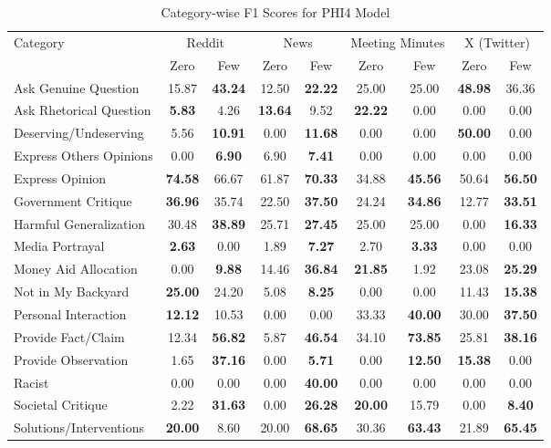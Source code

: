 \begin{table*}[htbp]
\centering
\begin{tabular}{l *{8}{c}}
\toprule
Category & \multicolumn{2}{c}{Reddit} & \multicolumn{2}{c}{News} & \multicolumn{2}{c}{Meeting Minutes} & \multicolumn{2}{c}{X (Twitter)} \\
& Zero & Few & Zero & Few & Zero & Few & Zero & Few \\
\midrule
Ask Genuine Question & 15.87 & \textbf{43.24} & 12.50 & \textbf{22.22} & 25.00 & 25.00 & \textbf{48.98} & 36.36 \\
Ask Rhetorical Question & \textbf{5.83} & 4.26 & \textbf{13.64} & 9.52 & \textbf{22.22} & 0.00 & 0.00 & 0.00 \\
Deserving/Undeserving & 5.56 & \textbf{10.91} & 0.00 & \textbf{11.68} & 0.00 & 0.00 & \textbf{50.00} & 0.00 \\
Express Others Opinions & 0.00 & \textbf{6.90} & 6.90 & \textbf{7.41} & 0.00 & 0.00 & 0.00 & 0.00 \\
Express Opinion & \textbf{74.58} & 66.67 & 61.87 & \textbf{70.33} & 34.88 & \textbf{45.56} & 50.64 & \textbf{56.50} \\
Government Critique & \textbf{36.96} & 35.74 & 22.50 & \textbf{37.50} & 24.24 & \textbf{34.86} & 12.77 & \textbf{33.51} \\
Harmful Generalization & 30.48 & \textbf{38.89} & 25.71 & \textbf{27.45} & 25.00 & 25.00 & 0.00 & \textbf{16.33} \\
Media Portrayal & \textbf{2.63} & 0.00 & 1.89 & \textbf{7.27} & 2.70 & \textbf{3.33} & 0.00 & 0.00 \\
Money Aid Allocation & 0.00 & \textbf{9.88} & 14.46 & \textbf{36.84} & \textbf{21.85} & 1.92 & 23.08 & \textbf{25.29} \\
Not in My Backyard & \textbf{25.00} & 24.20 & 5.08 & \textbf{8.25} & 0.00 & 0.00 & 11.43 & \textbf{15.38} \\
Personal Interaction & \textbf{12.12} & 10.53 & 0.00 & 0.00 & 33.33 & \textbf{40.00} & 30.00 & \textbf{37.50} \\
Provide Fact/Claim & 12.34 & \textbf{56.82} & 5.87 & \textbf{46.54} & 34.10 & \textbf{73.85} & 25.81 & \textbf{38.16} \\
Provide Observation & 1.65 & \textbf{37.16} & 0.00 & \textbf{5.71} & 0.00 & \textbf{12.50} & \textbf{15.38} & 0.00 \\
Racist & 0.00 & 0.00 & 0.00 & \textbf{40.00} & 0.00 & 0.00 & 0.00 & 0.00 \\
Societal Critique & 2.22 & \textbf{31.63} & 0.00 & \textbf{26.28} & \textbf{20.00} & 15.79 & 0.00 & \textbf{8.40} \\
Solutions/Interventions & \textbf{20.00} & 8.60 & 20.00 & \textbf{68.65} & 30.36 & \textbf{63.43} & 21.89 & \textbf{65.45} \\
\bottomrule
\end{tabular}
\caption{Category-wise F1 Scores for PHI4 Model}
\label{tab:phi4_category_breakdown}
\end{table*}